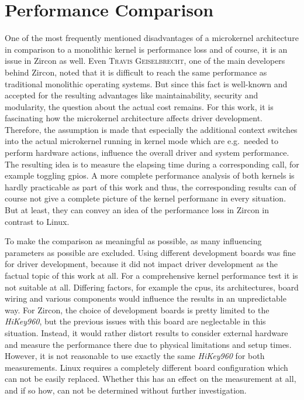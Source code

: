 \section{Performance Comparison}
One of the most frequently mentioned disadvantages of a microkernel architecture in comparison to a monolithic kernel is performance loss and of course, it is an issue in Zircon as well.
Even \textsc{Travis Geiselbrecht}, one of the main developers behind Zircon, noted that it is difficult to reach the same performance as traditional monolithic operating systems\cite{chat-zircon-arch}.
But since this fact is well-known and accepted for the resulting advantages like maintainability, security and modularity, the question about the actual cost remains.
For this work, it is fascinating how the microkernel architecture affects driver development.
Therefore, the assumption is made that especially the additional context switches into the actual microkernel running in kernel mode which are e.g.\ needed to perform hardware actions, influence the overall driver and system performance.
The resulting idea is to measure the elapsing time during a corresponding call, for example toggling \acp{gpio}.
A more complete performance analysis of both kernels is hardly practicable as part of this work and thus, the corresponding results can of course not give a complete picture of the kernel performanc in every situation.
But at least, they can convey an idea of the performance loss in Zircon in contrast to Linux.

To make the comparison as meaningful as possible, as many influencing parameters as possible are excluded.
Using different development boards was fine for driver development, because it did not impact driver development as the factual topic of this work at all.
For a comprehensive kernel performance test it is not suitable at all.
Differing factors, for example the \acp{cpu}, its architectures, board wiring and various components would influence the results in an unpredictable way.
For Zircon, the choice of development boards is pretty limited to the \textit{HiKey960}, but the previous issues with this board are neglectable in this situation.
Instead, it would rather distort results to consider external hardware and measure the performance there due to physical limitations and setup times.
However, it is not reasonable to use exactly the same \textit{HiKey960} for both measurements.
Linux requires a completely different board configuration which can not be easily replaced.
Whether this has an effect on the measurement at all, and if so how, can not be determined without further investigation.

